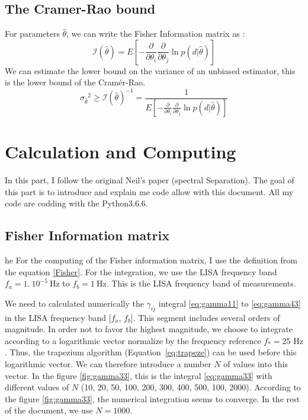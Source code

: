 \documentclass[a4paper,12pt]{article}
\begin{document}
\subsection{The Cramer-Rao bound}\label{sec:Cramer}

For parameters  $ \widehat{\theta}$, we can write the Fisher Information matrix as :
\begin{equation}
    \mathcal{I}(\widehat{\theta}) = E\left[-\frac{\partial}{\partial \theta_i}\frac{\partial}{\partial \theta_j} \ln{p(d|\widehat{\theta})}\right]
\end{equation}
We can estimate the lower bound on the variance of an unbiased estimator, this is the lower bound of the Cramér-Rao. 
\begin{equation}
    {\sigma_{\widehat{\theta}}}^2 \ge \mathcal{I}(\widehat{\theta})^{-1} = \frac{1}{E\left[-\frac{\partial}{\partial \theta_i}\frac{\partial}{\partial \theta_j} \ln{p(d|\widehat{\theta})}\right]}
\end{equation}



\section{Calculation and Computing}

In this part, I follow the original Neil's paper (spectral Separation). The goal of this part is to introduce and explain me code allow with this document. All my code are codding with the Python3.6.6. 

\subsection{Fisher Information matrix}\label{study1}
he
For the computing of the Fisher information matrix, I use the definition from the equation \ref{Fisher}. For the integration, we use the LISA frequency band $f_a = 1. \ 10^{-5} \ \text{Hz}$ to $f_b = 1 \ \text{Hz}$. This is the LISA frequency band of measurements. 

We need to calculated numerically the $\gamma_{ij}$ integral \ref{eq:gamma11} to \ref{eq:gamma43} in the LISA frequency band [$f_a$, $f_b$]. This segment includes several orders of magnitude. In order not to favor the highest magnitude, we choose to integrate according to a logarithmic vector normalize by the frequency reference $f_* = 25 \text{ Hz}$ . Thus, the trapezium algorithm (Equation~\ref{eq:trapeze}) can be used before this logarithmic vector. We can therefore introduce a number $N$ of values into this vector. In the figure \ref{fig:gamma33}, this is the integral \ref{eq:gamma33} with different values of $N$ (10, 20, 50, 100, 200, 300, 400, 500, 100, 2000). According to the figure \ref{fig:gamma33}, the numerical integration seems to converge. In the rest of the document, we use $N = 1000$. 
\end{document}
